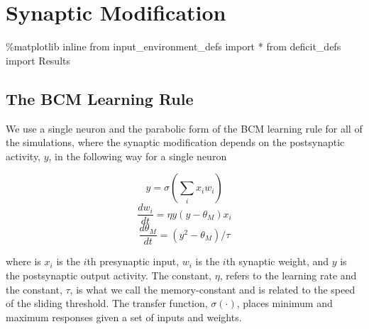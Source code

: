 \documentclass[
  letterpaper,
  number]{elsarticle}
\newenvironment{Shaded}{\begin{snugshade}}{\end{snugshade}}
\newcommand{\ImportTok}[1]{\textcolor[rgb]{0.00,0.46,0.62}{#1}}
\newcommand{\NormalTok}[1]{\textcolor[rgb]{0.00,0.23,0.31}{#1}}
\newcommand{\OperatorTok}[1]{\textcolor[rgb]{0.37,0.37,0.37}{#1}}
\begin{document}
\hypertarget{synaptic-modification}{%
\chapter{Synaptic Modification}\label{synaptic-modification}}

\begin{Shaded}
\begin{Highlighting}[]
\OperatorTok{\%}\NormalTok{matplotlib inline}
\ImportTok{from}\NormalTok{ input\_environment\_defs }\ImportTok{import} \OperatorTok{*}
\ImportTok{from}\NormalTok{ deficit\_defs }\ImportTok{import}\NormalTok{ Results}
\end{Highlighting}
\end{Shaded}

\hypertarget{the-bcm-learning-rule}{%
\section{The BCM Learning Rule}\label{the-bcm-learning-rule}}

We use a single neuron and the parabolic form of the
BCM\citep{BCM82, Blais:2008kx} learning rule for all of the simulations,
where the synaptic modification depends on the postsynaptic activity,
\(y\), in the following way for a single neuron

\[
y=\sigma\left(\sum_i x_i w_i \right)
\] \[
\frac{dw_i}{dt} = \eta y(y-\theta_M) x_i
\] \[
\frac{d\theta_M}{dt} = (y^2-\theta_M)/\tau
\]

where is \(x_i\) is the \(i\)th presynaptic input, \(w_i\) is the
\(i\)th synaptic weight, and \(y\) is the postsynaptic output activity.
The constant, \(\eta\), refers to the learning rate and the constant,
\(\tau\), is what we call the memory-constant and is related to the
speed of the sliding threshold. The transfer function,
\(\sigma(\cdot)\), places minimum and maximum responses given a set of
inputs and weights.
\end{document}
